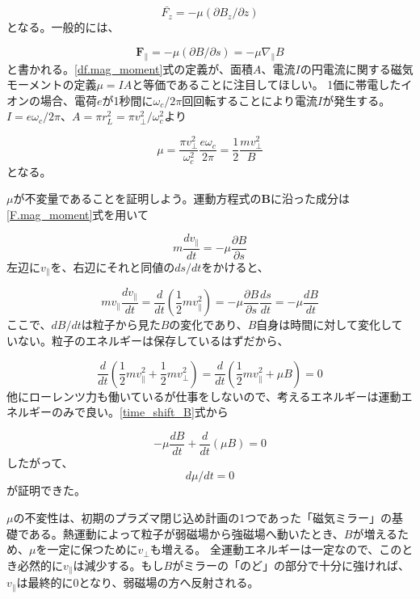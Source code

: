 \documentclass{ltjsarticle}
\numberwithin{equation}{section} %
\begin{document}
\begin{equation}
  \bar{F_z} = -\mu (\partial B_z / \partial z)
\end{equation}
となる。一般的には、

\begin{equation}
  \bm{F}_\parallel = -\mu (\partial B /\partial s) = -\mu \nabla_\parallel B \label{F.mag_moment}
\end{equation}
と書かれる。\eqref{df.mag_moment}式の定義が、面積$A$、電流$I$の円電流に関する磁気モーメントの定義$\mu= IA$と等価であることに注目してほしい。
1価に帯電したイオンの場合、電荷$e$が1秒間に$\omega_c/2\pi$回回転することにより電流$I$が発生する。$I=e\omega_c/2\pi$、$A=\pi r_L ^2 = \pi v_\perp ^2/\omega_c ^2$より

\[
 \mu = \frac{\pi v_\perp ^2}{\omega_c ^2}\frac{e\omega_c}{2\pi} = \frac{1}{2}\frac{mv_\perp ^2}{B}
\]
となる。

$\mu$が不変量であることを証明しよう。運動方程式の$\bm{B}$に沿った成分は\eqref{F.mag_moment}式を用いて

\begin{equation}
  m\frac{dv_\parallel}{dt} = -\mu \frac{\partial B}{\partial s}
\end{equation}
左辺に$v_\parallel$を、右辺にそれと同値の$ds/dt$をかけると、

\begin{equation}
  mv_\parallel \frac{dv_\parallel}{dt} = \frac{d}{dt}\left(\frac{1}{2}mv_\parallel ^2\right) = -\mu \frac{\partial B}{\partial s}\frac{ds}{dt} = -\mu \frac{dB}{dt} \label{time_shift_B}
\end{equation}
ここで、$dB/dt$は粒子から見た$B$の変化であり、$B$自身は時間に対して変化していない。粒子のエネルギーは保存しているはずだから、

\begin{equation}
  \frac{d}{dt}\left(\frac{1}{2}mv_\parallel ^2 + \frac{1}{2}mv_\perp ^2\right) = \frac{d}{dt}\left(\frac{1}{2}mv_\parallel ^2 + \mu B\right) = 0
\end{equation}
他にローレンツ力も働いているが仕事をしないので、考えるエネルギーは運動エネルギーのみで良い。\eqref{time_shift_B}式から

\[
 -\mu \frac{dB}{dt} + \frac{d}{dt}(\mu B) = 0
\]
したがって、
\begin{equation}
  d\mu/dt = 0
\end{equation}
が証明できた。

$\mu$の不変性は、初期のプラズマ閉じ込め計画の1つであった「磁気ミラー」の基礎である。熱運動によって粒子が弱磁場から強磁場へ動いたとき、$B$が増えるため、$\mu$を一定に保つために$v_\perp$も増える。
全運動エネルギーは一定なので、このとき必然的に$v_\parallel$は減少する。もし$B$がミラーの「のど」の部分で十分に強ければ、$v_\parallel$は最終的に0となり、弱磁場の方へ反射される。
\end{document}
